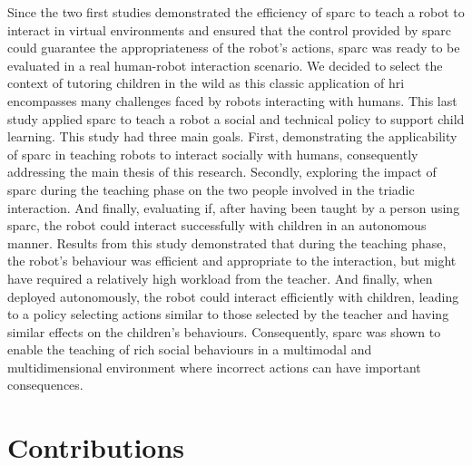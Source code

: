 Since the two first studies demonstrated the efficiency of \gls{sparc} to teach a robot to interact in virtual environments and ensured that the control provided by \gls{sparc} could guarantee the appropriateness of the robot's actions, \gls{sparc} was ready to be evaluated in a real human-robot interaction scenario. We decided to select the context of tutoring children in the wild as this classic application of \gls{hri} encompasses many challenges faced by robots interacting with humans. This last study applied \gls{sparc} to teach a robot a social and technical policy to support child learning. This study had three main goals. First, demonstrating the applicability of \gls{sparc} in teaching robots to interact socially with humans, consequently addressing the main thesis of this research. Secondly, exploring the impact of \gls{sparc} during the teaching phase on the two people involved in the triadic interaction. And finally, evaluating if, after having been taught by a person using \gls{sparc}, the robot could interact successfully with children in an autonomous manner. Results from this study demonstrated that during the teaching phase, the robot's behaviour was efficient and appropriate to the interaction, but might have required a relatively high workload from the teacher. And finally, when deployed autonomously, the robot could interact efficiently with children, leading to a policy selecting actions similar to those selected by the teacher and having similar effects on the children's behaviours. Consequently, \gls{sparc} was shown to enable the teaching of rich social behaviours in a multimodal and multidimensional environment where incorrect actions can have important consequences.

\section{Contributions}\label{sec:conc_contribution}

